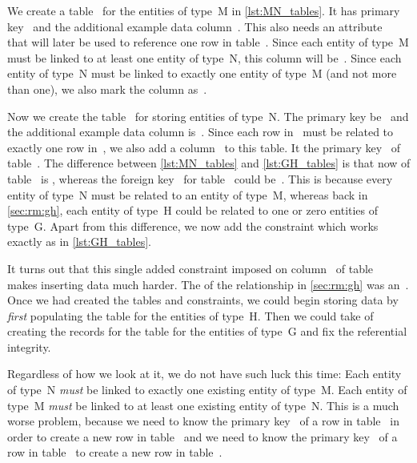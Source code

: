 We create a table~ for the entities of type~M in \cref{lst:MN_tables}.
It has primary key~ and the additional example data column~.
This also needs an attribute~ that will later be used to reference one row in table~.
Since each entity of type~M must be linked to at least one entity of type~N, this column will be~.
Since each entity of type~N must be linked to exactly one entity of type~M (and not more than one), we also mark the column as~.

Now we create the table~ for storing entities of type~N.
The primary key be~ and the additional example data column is~.
Since each row in~ must be related to exactly one row in~, we also add a column~ to this table.
It  the primary key~ of table~.
The difference between \cref{lst:MN_tables} and \cref{lst:GH_tables} is that now  of table~ is , whereas the foreign key~ for table~ could be~.
This is because every entity of type~N must be related to an entity of type~M, whereas back in \cref{sec:rm:gh}, each entity of type~H could be related to one or zero entities of type~G.
Apart from this difference, we now add the constraint  which works exactly as  in \cref{lst:GH_tables}.

It turns out that this single added  constraint imposed on column~ of table~ makes inserting data much harder.
The  of the relationship in \cref{sec:rm:gh} was an~.
Once we had created the tables and constraints, we could begin storing data by \emph{first} populating the table for the entities of type~H.
Then we could take of creating the records for the table for the entities of type~G and fix the referential integrity.

Regardless of how we look at it, we do not have such luck this time:
Each entity of type~N \emph{must} be linked to exactly one existing entity of type~M.
Each entity of type~M \emph{must} be linked to at least one existing entity of type~N.
This is a much worse problem, because we need to know the primary key~ of a row in table~ in order to create a new row in table~ and we need to know the primary key~ of a row in table~ to create a new row in table~.

